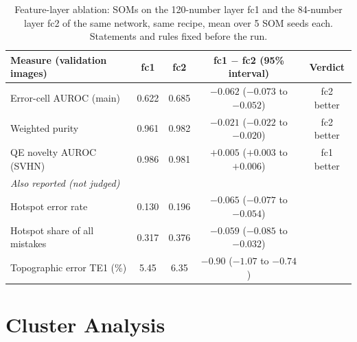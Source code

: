 \documentclass[11pt]{article}
\begin{document}
\begin{table}[H]
\centering
\renewcommand{\arraystretch}{1.12}
\small
\begin{tabular}{|l|c|c|c|c|}
\hline
\textbf{Measure (validation images)} & \textbf{fc1} & \textbf{fc2} & \textbf{fc1 $-$ fc2 (95\% interval)} & \textbf{Verdict} \\ \hline
Error-cell AUROC (main) & 0.622 & 0.685 & $-0.062$ ($-0.073$ to $-0.052$) & fc2 better \\ \hline
Weighted purity & 0.961 & 0.982 & $-0.021$ ($-0.022$ to $-0.020$) & fc2 better \\ \hline
QE novelty AUROC (SVHN) & 0.986 & 0.981 & $+0.005$ ($+0.003$ to $+0.006$) & fc1 better \\ \hline
\multicolumn{5}{|l|}{\textit{Also reported (not judged)}} \\ \hline
Hotspot error rate & 0.130 & 0.196 & $-0.065$ ($-0.077$ to $-0.054$) & \\ \hline
Hotspot share of all mistakes & 0.317 & 0.376 & $-0.059$ ($-0.085$ to $-0.032$) & \\ \hline
Topographic error TE1 (\%) & 5.45 & 6.35 & $-0.90$ ($-1.07$ to $-0.74$) & \\ \hline
\end{tabular}
\caption{Feature-layer ablation: SOMs on the 120-number layer fc1 and the 84-number layer fc2 of the same network, same recipe, mean over 5 SOM seeds each. Statements and rules fixed before the run.}
\label{tab:layer_ablation}
\end{table}

\section{Cluster Analysis}\label{sec:cluster}
\end{document}
